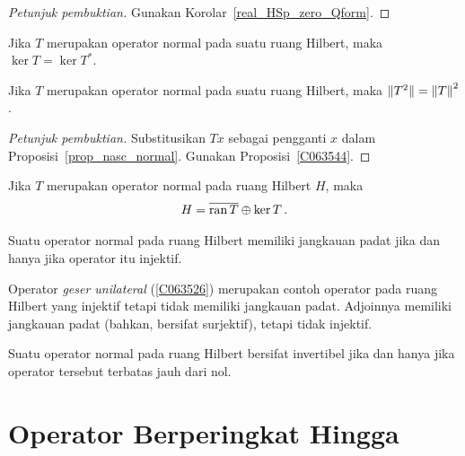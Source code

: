 \begin{proof}[\emph{Petunjuk pembuktian}] Gunakan Korolar~\ref{real_HSp_zero_Qform}.  \ns
\end{proof}

\begin{cor} Jika $T$ merupakan operator normal pada suatu ruang Hilbert, maka $\ker T = \ker T^*$.
\end{cor}

\begin{prop} Jika $T$ merupakan operator normal pada suatu ruang Hilbert, maka $\lVert T^2\rVert = {\lVert T\rVert}^2$.
\end{prop}

\begin{proof}[\emph{Petunjuk pembuktian}] Substitusikan $Tx$ sebagai pengganti $x$ dalam Proposisi~\ref{prop_nasc_normal}. Gunakan
Proposisi~\ref{C063544}.  \ns
\end{proof}

\begin{prop} Jika $T$ merupakan operator normal pada ruang Hilbert $H$, maka
   \[ H = \overline{\operatorname{ran} T} \oplus \ker T\,.  \]
\end{prop}

\begin{cor} Suatu operator normal pada ruang Hilbert memiliki jangkauan padat jika dan hanya jika operator itu injektif.
\end{cor}

\begin{exam} Operator \emph{geser unilateral} (\ref{C063526}) merupakan contoh operator pada ruang Hilbert yang injektif
tetapi tidak memiliki jangkauan padat. Adjoinnya memiliki jangkauan padat (bahkan, bersifat surjektif), tetapi tidak injektif.
\end{exam}

\begin{cor} Suatu operator normal pada ruang Hilbert bersifat invertibel jika dan hanya jika operator tersebut terbatas jauh dari nol.
\end{cor}
















\section{Operator Berperingkat Hingga}

